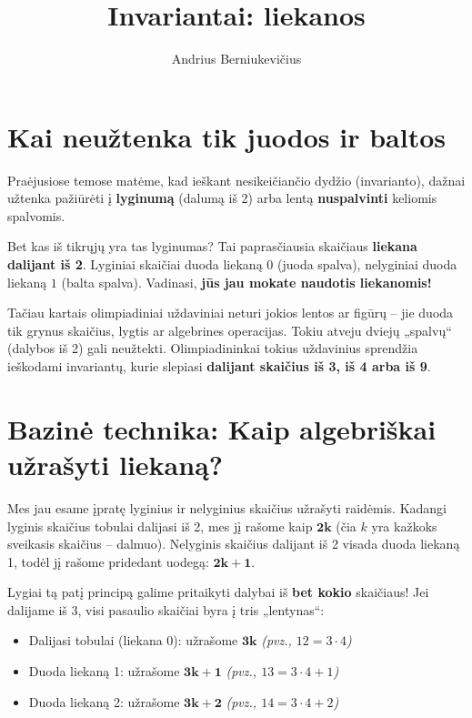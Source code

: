 \documentclass[11pt,a4paper]{scrartcl}
\title{Invariantai: liekanos}
\author{Andrius Berniukevičius}
\begin{document}
\maketitle

\section{Kai neužtenka tik juodos ir baltos}

Praėjusiose temose matėme, kad ieškant nesikeičiančio dydžio (invarianto), dažnai užtenka pažiūrėti į \textbf{lyginumą} (dalumą iš 2) arba lentą \textbf{nuspalvinti} keliomis spalvomis.

Bet kas iš tikrųjų yra tas lyginumas? Tai paprasčiausia skaičiaus \textbf{liekana dalijant iš 2}. 
Lyginiai skaičiai duoda liekaną $0$ (juoda spalva), nelyginiai duoda liekaną $1$ (balta spalva). Vadinasi, \textbf{jūs jau mokate naudotis liekanomis!}

Tačiau kartais olimpiadiniai uždaviniai neturi jokios lentos ar figūrų – jie duoda tik grynus skaičius, lygtis ar algebrines operacijas. Tokiu atveju dviejų „spalvų“ (dalybos iš 2) gali neužtekti. Olimpiadininkai tokius uždavinius sprendžia ieškodami invariantų, kurie slepiasi \textbf{dalijant skaičius iš 3, iš 4 arba iš 9}.
\section{Bazinė technika: Kaip algebriškai užrašyti liekaną?}

Mes jau esame įpratę lyginius ir nelyginius skaičius užrašyti raidėmis. 
Kadangi lyginis skaičius tobulai dalijasi iš 2, mes jį rašome kaip $\mathbf{2k}$ (čia $k$ yra kažkoks sveikasis skaičius – dalmuo). Nelyginis skaičius dalijant iš 2 visada duoda liekaną 1, todėl jį rašome pridedant uodegą: $\mathbf{2k + 1}$.

Lygiai tą patį principą galime pritaikyti dalybai iš \textbf{bet kokio} skaičiaus! Jei dalijame iš 3, visi pasaulio skaičiai byra į tris „lentynas“:
\begin{itemize}
    \item Dalijasi tobulai (liekana 0): užrašome $\mathbf{3k}$ \textit{(pvz., $12 = 3 \cdot 4$)}
    \item Duoda liekaną 1: užrašome $\mathbf{3k + 1}$ \textit{(pvz., $13 = 3 \cdot 4 + 1$)}
    \item Duoda liekaną 2: užrašome $\mathbf{3k + 2}$ \textit{(pvz., $14 = 3 \cdot 4 + 2$)}
\end{itemize}
\end{document}
